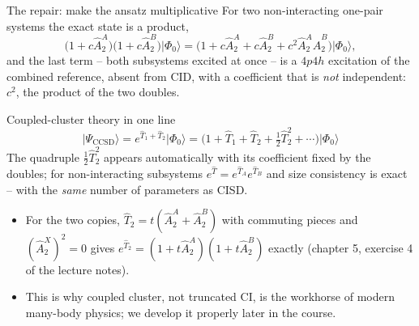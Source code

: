 \documentclass[aspectratio=169,10pt]{beamer}
\newcommand{\ket}[1]{\vert #1\rangle}
\begin{document}
\begin{frame}{The repair: make the ansatz multiplicative}
  \small
  For two non-interacting one-pair systems the exact state is a product,
  \[
    \bigl(1+c\hat{A}_2^A\bigr)\bigl(1+c\hat{A}_2^B\bigr)\ket{\Phi_0}
    =\bigl(1+c\hat{A}_2^A+c\hat{A}_2^B+c^2\hat{A}_2^A\hat{A}_2^B\bigr)\ket{\Phi_0},
  \]
  and the last term -- both subsystems excited at once -- is a $4p4h$ excitation of the combined reference, absent from CID, with a coefficient that is \emph{not} independent: $c^2$, the product of the two doubles.
  \begin{block}{Coupled-cluster theory in one line}
    \[
      \ket{\Psi_{\mathrm{CCSD}}}=e^{\hat{T}_1+\hat{T}_2}\ket{\Phi_0}
      =\bigl(1+\hat{T}_1+\hat{T}_2+\tfrac12\hat{T}_2^2+\cdots\bigr)\ket{\Phi_0}
    \]
    The quadruple $\tfrac12\hat{T}_2^2$ appears automatically with its coefficient fixed by the doubles; for non-interacting subsystems $e^{\hat{T}}=e^{\hat{T}_A}e^{\hat{T}_B}$ and size consistency is exact -- with the \emph{same} number of parameters as CISD.
  \end{block}
  \begin{itemize}
    \item For the two copies, $\hat{T}_2=t(\hat{A}_2^A+\hat{A}_2^B)$ with commuting pieces and $(\hat{A}_2^X)^2=0$ gives $e^{\hat{T}_2}=(1+t\hat{A}_2^A)(1+t\hat{A}_2^B)$ exactly (chapter 5, exercise 4 of the lecture notes).
    \item This is why coupled cluster, not truncated CI, is the workhorse of modern many-body physics; we develop it properly later in the course.
  \end{itemize}
\end{frame}
\end{document}
